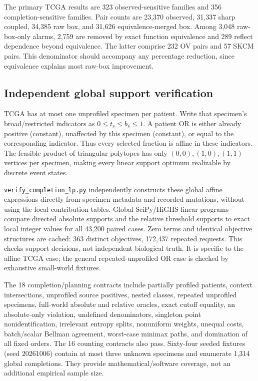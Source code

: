 \documentclass[10pt,letterpaper]{article}
\begin{document}
\begin{center}\small\end{center}

The primary TCGA results are 323 observed-sensitive families and 356 completion-sensitive families. Pair counts are 23,370 observed, 31,337 sharp coupled, 34,385 raw box, and 31,626 equivalence-merged box. Among 3,048 raw-box-only alarms, 2,759 are removed by exact function equivalence and 289 reflect dependence beyond equivalence. The latter comprise 232 OV pairs and 57 SKCM pairs. This denominator should accompany any percentage reduction, since equivalence explains most raw-box improvement.

\subsection{Independent global support verification}
TCGA has at most one unprofiled specimen per patient. Write that specimen's broad/restricted indicators as $0\leq t_s\leq b_s\leq1$. A patient OR is either already positive (constant), unaffected by this specimen (constant), or equal to the corresponding indicator. Thus every selected fraction is affine in these indicators. The feasible product of triangular polytopes has only $(0,0),(1,0),(1,1)$ vertices per specimen, making every linear support optimum realizable by discrete event states.

\texttt{verify\_completion\_lp.py} independently constructs these global affine expressions directly from specimen metadata and recorded mutations, without using the local contribution tables. Global SciPy/HiGHS linear programs compare directed absolute supports and the relative threshold supports to exact local integer values for all 43,200 paired cases. Zero terms and identical objective structures are cached: 363 distinct objectives, 172,437 repeated requests. This checks support decisions, not independent biological truth. It is specific to the affine TCGA case; the general repeated-unprofiled OR case is checked by exhaustive small-world fixtures.

The 18 completion/planning contracts include partially profiled patients, context intersections, unprofiled source positives, nested classes, repeated unprofiled specimens, full-world absolute and relative oracles, exact cutoff equality, an absolute-only violation, undefined denominators, singleton point nonidentification, irrelevant entropy splits, nonuniform weights, unequal costs, batch/scalar Bellman agreement, worst-case minimax paths, and domination of all fixed orders. The 16 counting contracts also pass. Sixty-four seeded fixtures (seed 20261006) contain at most three unknown specimens and enumerate 1,314 global completions. They provide mathematical/software coverage, not an additional empirical sample size.
\end{document}
